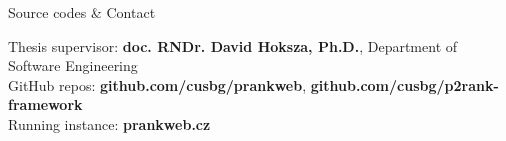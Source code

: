 \documentclass[portrait,a0paper,fontscale=0.25]{baposter}
\begin{document}
\begin{poster}

\begin{posterbox}[column=1, name=conclusion, below=result2, bottomaligned=tech]{Source codes \& Contact}


\begin{minipage}[t]{\linewidth}
	\begin{minipage}[t]{0.75\linewidth}
		Thesis supervisor: \textbf{doc. RNDr. David Hoksza, Ph.D.}, Department of Software Engineering\\

		GitHub repos: \textbf{github.com/cusbg/prankweb}, \textbf{github.com/cusbg/p2rank-framework}\\

		Running instance: \textbf{prankweb.cz}\\


\end{minipage}
\end{minipage}
\end{posterbox}
\end{poster}
\end{document}
